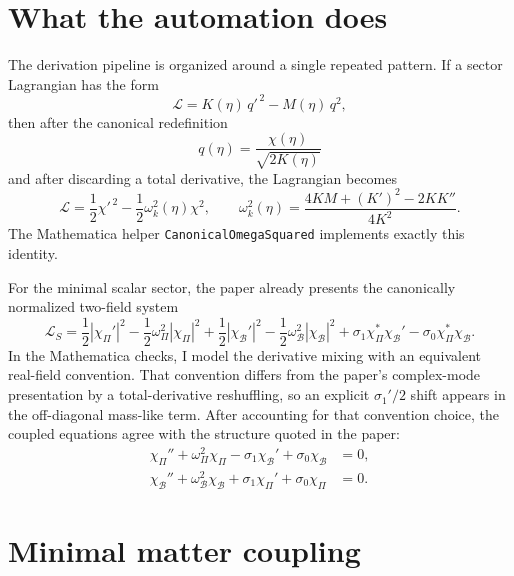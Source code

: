 \documentclass[11pt]{article}
\begin{document}
\section{What the automation does}
The derivation pipeline is organized around a single repeated pattern. If a sector Lagrangian has the form
\begin{equation}
\mathcal{L} = K(\eta)\, q'^{\,2} - M(\eta)\, q^2,
\end{equation}
then after the canonical redefinition
\begin{equation}
q(\eta) = \frac{\chi(\eta)}{\sqrt{2K(\eta)}}
\end{equation}
and after discarding a total derivative, the Lagrangian becomes
\begin{equation}
\mathcal{L} = \frac{1}{2}\chi'^{\,2} - \frac{1}{2}\omega_k^2(\eta)\chi^2,
\qquad
\omega_k^2(\eta) = \frac{4KM + (K')^2 - 2K K''}{4K^2}.
\end{equation}
The Mathematica helper \texttt{CanonicalOmegaSquared} implements exactly this identity.

For the minimal scalar sector, the paper already presents the canonically normalized two-field system
\begin{equation}
\mathcal{L}_S =
\frac12 |\chi_\Pi'|^2 - \frac12 \omega_\Pi^2 |\chi_\Pi|^2
+ \frac12 |\chi_{\mathcal B}'|^2 - \frac12 \omega_{\mathcal B}^2 |\chi_{\mathcal B}|^2
+ \sigma_1 \chi_\Pi^\ast \chi_{\mathcal B}' - \sigma_0 \chi_\Pi^\ast \chi_{\mathcal B}.
\end{equation}
In the Mathematica checks, I model the derivative mixing with an equivalent real-field convention. That convention differs from the paper's complex-mode presentation by a total-derivative reshuffling, so an explicit $\sigma_1'/2$ shift appears in the off-diagonal mass-like term. After accounting for that convention choice, the coupled equations agree with the structure quoted in the paper:
\begin{align}
\chi_\Pi'' + \omega_\Pi^2 \chi_\Pi - \sigma_1 \chi_{\mathcal B}' + \sigma_0 \chi_{\mathcal B} &= 0, \\
\chi_{\mathcal B}'' + \omega_{\mathcal B}^2 \chi_{\mathcal B} + \sigma_1 \chi_\Pi' + \sigma_0 \chi_\Pi &= 0.
\end{align}

\section{Minimal matter coupling}
\end{document}
